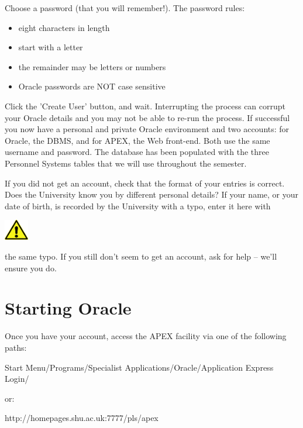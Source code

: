 \begin{center}
\begin{minipage}{14.441cm}
Choose a password (that you will remember!). The password rules:

\begin{itemize}
\item eight characters in length
\item start with a letter
\item the remainder may be letters or numbers
\item Oracle passwords are NOT case sensitive
\end{itemize}
\end{minipage}
\end{center}
Click the 'Create User' button, and wait. Interrupting the process can corrupt your Oracle details and you may not be able to re-run the process. If successful you now have a personal and private Oracle environment and two accounts: for Oracle, the DBMS, and for APEX, the Web front-end. Both use the same username and password. The database has been populated with the three Personnel Systems tables that we will use throughout the semester.

If you did not get an account, check that the format of your entries is correct. Does the University know you by different personal details? If your name, or your date of birth, is recorded by the University with a typo, enter it here with

\begin{center}
  
\includegraphics[width=1.06cm,height=0.903cm]{images/img (2).png}

\end{center}
the same typo. If you still don't seem to get an account, ask for help -- we'll ensure you do.

\clearpage 
\section{Starting Oracle}
Once you have your account, access the APEX facility via  one of the following paths:

Start Menu/Programs/Specialist Applications/Oracle/Application Express Login/

or:

http://homepages.shu.ac.uk:7777/pls/apex

